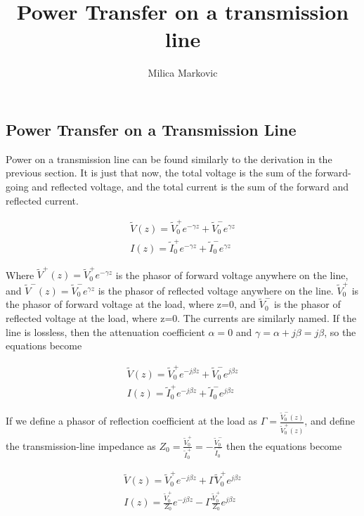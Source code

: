 \documentclass{ximera}
\title{Power Transfer on a transmission line}
\author{Milica Markovic}
\begin{document}
  
\begin{abstract}  

\end{abstract}  
\maketitle    

\subsection*{Power Transfer on a Transmission Line}

Power on a transmission line can be found similarly to the derivation in the previous section. It is just that now, the total voltage is the sum of the forward-going and reflected voltage, and the total current is the sum of the forward and reflected current. 


\begin{eqnarray}
\tilde{V}(z)=\tilde{V}_0^+ e^{-\gamma z} + \tilde{V}_0^- e^{\gamma z}\label{eq4a} \\
I(z)=\tilde{I}_0^+ e^{-\gamma z} + \tilde{I}_0^- e^{\gamma z}\label{eq5a}
\end{eqnarray}

Where $\tilde{V}^+(z)=\tilde{V}_0^+ e^{-\gamma z} $ is the phasor of forward voltage anywhere on the line, and $\tilde{V}^-(z)=\tilde{V}_0^- e^{\gamma z}$ is the phasor of reflected voltage anywhere on the line. $\tilde{V}_0^+$ is the phasor of forward voltage at the load, where z=0, and  $\tilde{V}_0^-$ is the phasor of reflected voltage at the load, where z=0.  The currents are similarly named. If the line is lossless, then the attenuation coefficient $\alpha=0$ and $\gamma= \alpha + j \beta = j \beta$, so the equations become



\begin{eqnarray}
\tilde{V}(z)=\tilde{V}_0^+ e^{-j\beta z} + \tilde{V}_0^- e^{j\beta z}\label{eq4} \\
I(z)=\tilde{I}_0^+ e^{-j\beta z} + \tilde{I}_0^- e^{j\beta z}\label{eq5}
\end{eqnarray}

If we define a phasor of reflection coefficient at the load as $\Gamma =\frac{\tilde{V}^-_0(z)}{\tilde{V}^+_0(z)}$, and define the transmission-line impedance as $Z_0=\frac{\tilde{V}_0^+}{\tilde{I}_0^+}=-\frac{\tilde{V}_0^-}{\tilde{I}_0^-}$ then the equations become

\begin{eqnarray}
\tilde{V}(z)=\tilde{V}_0^+ e^{-j\beta z} + \Gamma \tilde{V}_0^+ e^{j\beta z}\label{eq4b} \\
I(z)=\frac{\tilde{V}_0^+}{Z_0} e^{-j\beta z} - \Gamma \frac{\tilde{V}_0^+}{Z_0} e^{j\beta z}\label{eq5b}
\end{eqnarray}
\end{document}
